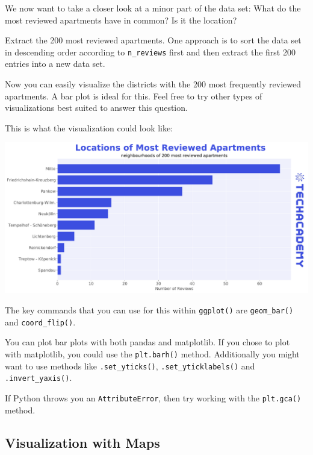 \documentclass[
  11pt,
]{article}
\newenvironment{tips}[1]
  {
  \begin{itemize}
  \footnotesize
  \renewcommand{\labelitemi}{
    \raisebox{-.7\height}[0pt][0pt]{
      {\setkeys{Gin}{width=3em,keepaspectratio}
        \texttt{[image: images/\#1.png]}}
    }
  }
  \setlength{\fboxsep}{1em}
  \begin{rbox}
  \item
  }
  {
  \end{rbox}
  \end{itemize}
  }
\newenvironment{tipsp}[1]
  {
  \begin{itemize}
  \footnotesize
  \renewcommand{\labelitemi}{
    \raisebox{-.7\height}[0pt][0pt]{
      {\setkeys{Gin}{width=3em,keepaspectratio}
        \texttt{[image: images/\#1.png]}}
    }
  }
  \setlength{\fboxsep}{1em}
  \begin{pbox}
  \item
  }
  {
  \end{pbox}
  \end{itemize}
  }
\begin{document}
We now want to take a closer look at a minor part of the data set: What do the most reviewed apartments have in common?
Is it the location?

Extract the 200 most reviewed apartments.
One approach is to sort the data set in descending order according to \texttt{n\_reviews} first and then extract the first 200 entries into a new data set.

Now you can easily visualize the districts with the 200 most frequently reviewed apartments.
A bar plot is ideal for this.
Feel free to try other types of visualizations best suited to answer this question.

This is what the visualization could look like:

\begin{center}\includegraphics[width=1\linewidth]{plot/01_python/hbars_reviews} \end{center}

\begin{tips}r
The key commands that you can use for this within \texttt{ggplot()} are \texttt{geom\_bar()} and \texttt{coord\_flip()}.

\end{tips}

\begin{tipsp}p
You can plot bar plots with both pandas and matplotlib.
If you chose to plot with matplotlib, you could use the \texttt{plt.barh()} method.
Additionally you might want to use methods like \texttt{.set\_yticks()}, \texttt{.set\_yticklabels()} and \texttt{.invert\_yaxis()}.

If Python throws you an \texttt{AttributeError}, then try working with the \texttt{plt.gca()} method.

\end{tipsp}

\hypertarget{visualization-with-maps}{%
\subsection{Visualization with Maps}\label{visualization-with-maps}}
\end{document}
